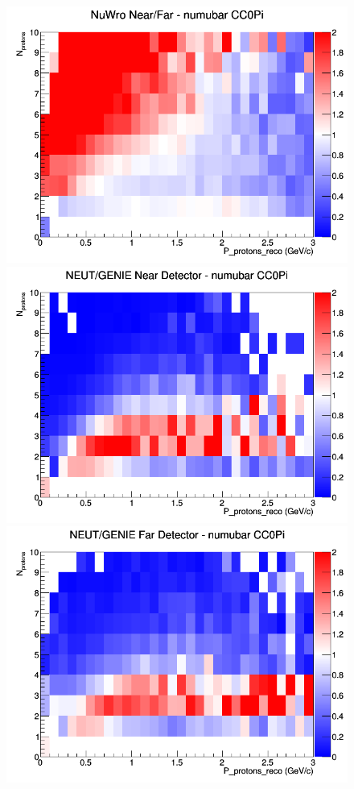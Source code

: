 \begin{figure}[h]
\endminipage
{}
\includegraphics[width=\linewidth]{eff_N_P/GAr/protons/ratios/CC0Pi_NuWro_numubar_NF_N_P.png}
\endminipage
\newline
{}
\includegraphics[width=\linewidth]{eff_N_P/GAr/protons/ratios/CC0Pi_NEUT_GENIE_numubar_near_N_P.png}
\endminipage
{}
\includegraphics[width=\linewidth]{eff_N_P/GAr/protons/ratios/CC0Pi_NEUT_GENIE_numubar_far_N_P.png}

\end{figure}

